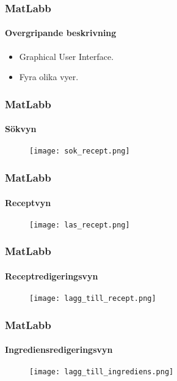 \begin{frame}
  \frametitle{MatLabb}
  \framesubtitle{Overgripande beskrivning}
  \begin{itemize}
  \item<1-> Graphical User Interface.
  \item<2-> Fyra olika vyer.
  \end{itemize}
\end{frame}

\begin{frame}
  \frametitle{MatLabb}
  \framesubtitle{Sökvyn}
  \begin{figure}[H]
    \centering 
    \texttt{[image: sok\_recept.png]} 
  \end{figure}
\end{frame}

\begin{frame}
  \frametitle{MatLabb}
  \framesubtitle{Receptvyn}
  \begin{figure}[H]
    \centering 
    \texttt{[image: las\_recept.png]} 
  \end{figure}
\end{frame}

\begin{frame}
  \frametitle{MatLabb}
  \framesubtitle{Receptredigeringsvyn}
  \begin{figure}[H]
    \centering 
    \texttt{[image: lagg\_till\_recept.png]} 
  \end{figure}
\end{frame}

\begin{frame}
  \frametitle{MatLabb}
  \framesubtitle{Ingrediensredigeringsvyn}
  \begin{figure}[H]
    \centering 
    \texttt{[image: lagg\_till\_ingrediens.png]} 
  \end{figure}
\end{frame}
